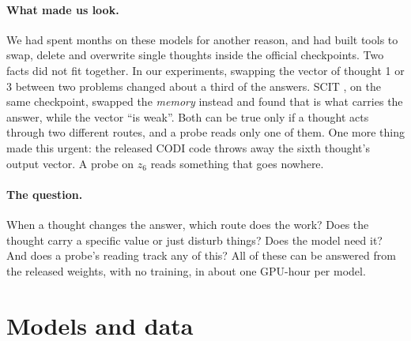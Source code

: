 \documentclass{article}
\begin{document}
\paragraph{What made us look.} We had spent months on these models for another reason, and had built tools to swap, delete and overwrite single thoughts inside the official checkpoints. Two facts did not fit together. In our experiments, swapping the vector of thought 1 or 3 between two problems changed about a third of the answers. SCIT \citep{ding2026scit}, on the same checkpoint, swapped the \emph{memory} instead and found that is what carries the answer, while the vector ``is weak''. Both can be true only if a thought acts through two different routes, and a probe reads only one of them. One more thing made this urgent: the released CODI code throws away the sixth thought's output vector. A probe on $z_6$ reads something that goes nowhere.

\paragraph{The question.} When a thought changes the answer, which route does the work? Does the thought carry a specific value or just disturb things? Does the model need it? And does a probe's reading track any of this? All of these can be answered from the released weights, with no training, in about one GPU-hour per model.

\section{Models and data}
\end{document}
